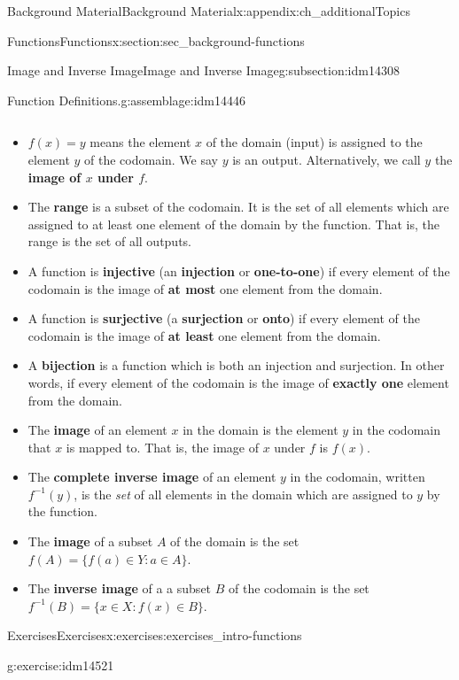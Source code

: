 \documentclass[oneside,10pt,]{book}
\newcommand{\terminology}[1]{\textbf{#1}}
\numberwithin{equation}{chapter}
\def\inv{^{-1}}
\def\st{:}
\begin{document}
\begin{appendixptx}{Background Material}{}{Background Material}{}{}{x:appendix:ch_additionalTopics}
\begin{sectionptx}{Functions}{}{Functions}{}{}{x:section:sec_background-functions}
\begin{subsectionptx}{Image and Inverse Image}{}{Image and Inverse Image}{}{}{g:subsection:idm14308}
\begin{assemblage}{Function Definitions.}{g:assemblage:idm14446}
\begin{itemize}[label=\textbullet]
\begin{equation*}
\end{equation*}
%
\item{}\(f(x) = y\) means the element \(x\) of the domain (input) is assigned to the element \(y\) of the codomain. We say \(y\) is an output. Alternatively, we call \(y\) the \terminology{image of \(x\) under \(f\)}.%
\item{}The \terminology{range} is a subset of the codomain. It is the set of all elements which are assigned to at least one element of the domain by the function. That is, the range is the set of all outputs.%
\item{}A function is \terminology{injective} (an \terminology{injection} or \terminology{one-to-one}) if every element of the codomain is the image of \terminology{at most} one element from the domain.%
\item{}A function is \terminology{surjective} (a \terminology{surjection} or \terminology{onto}) if every element of the codomain is the image of \terminology{at least} one element from the domain.%
\item{}A \terminology{bijection} is a function which is both an injection and surjection. In other words, if every element of the codomain is the image of \terminology{exactly one} element from the domain.%
\item{}The \terminology{image} of an element \(x\) in the domain is the element \(y\) in the codomain that \(x\) is mapped to.  That is, the image of \(x\) under \(f\) is  \(f(x)\).%
\item{}The \terminology{complete inverse image} of an element \(y\) in the codomain, written \(f\inv(y)\), is the \emph{set} of all elements in the domain which are assigned to \(y\) by the function.%
\item{}The \terminology{image} of a subset \(A\) of the domain is the set \(f(A) = \{f(a) \in Y \st a \in A\}\).%
\item{}The \terminology{inverse image} of a a subset \(B\) of the codomain is the set \(f\inv(B) = \{x \in X \st f(x) \in B\}\).%
\end{itemize}
%
\end{assemblage}
\end{subsectionptx}
%
%
\typeout{************************************************}
\typeout{************************************************}
%
\begin{exercises-subsection}{Exercises}{}{Exercises}{}{}{x:exercises:exercises_intro-functions}
\begin{divisionexercise}{1}{}{}{g:exercise:idm14521}%

\end{divisionexercise}
\end{exercises-subsection}
\end{sectionptx}
\end{appendixptx}
\end{document}
